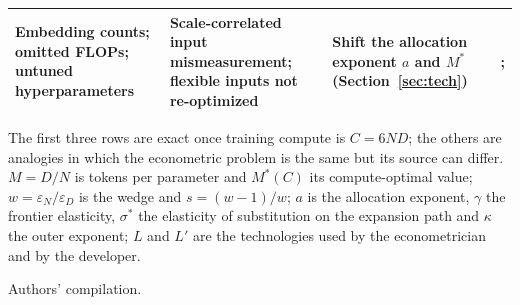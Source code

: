 \begin{table}[tp]
\begin{tabular}{@{}>{\raggedright\arraybackslash}p{}>{\raggedright\arraybackslash}p{}>{\raggedright\arraybackslash}p{}>{\raggedright\arraybackslash}p{}@{}}
Embedding counts; omitted FLOPs; untuned hyperparameters & Scale-correlated input mismeasurement; flexible inputs not re-optimized & Shift the allocation exponent $a$ and $M^*$ (Section~\ref{sec:tech}) & \citealt{basu1997returns}; \citealt{porian2024resolving} \\
\bottomrule
\end{tabular}
\par\smallskip
\begin{tablenotes}
The first three rows are exact once training compute is $C=6ND$; the others are analogies in which the econometric
problem is the same but its source can differ. $M=D/N$ is tokens per parameter and $M^*(C)$ its compute-optimal value;
$w=\varepsilon_N/\varepsilon_D$ is the wedge and $s=(w-1)/w$; $a$ is the allocation exponent, $\gamma$ the frontier
elasticity, $\sigma^*$ the elasticity of substitution on the expansion path and $\kappa$ the outer exponent; $L$ and
$L'$ are the technologies used by the econometrician and by the developer.
\end{tablenotes}
\begin{tablenotes}[Source]
Authors' compilation.
\end{tablenotes}
\end{table}

